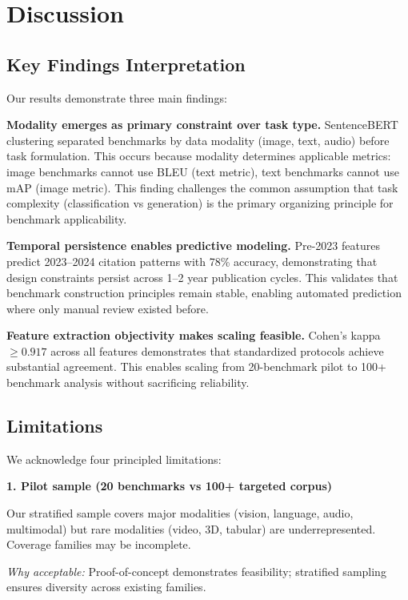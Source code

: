 \section{Discussion}

\subsection{Key Findings Interpretation}

Our results demonstrate three main findings:

\textbf{Modality emerges as primary constraint over task type.} SentenceBERT clustering separated benchmarks by data modality (image, text, audio) before task formulation. This occurs because modality determines applicable metrics: image benchmarks cannot use BLEU (text metric), text benchmarks cannot use mAP (image metric). This finding challenges the common assumption that task complexity (classification vs generation) is the primary organizing principle for benchmark applicability.

\textbf{Temporal persistence enables predictive modeling.} Pre-2023 features predict 2023--2024 citation patterns with 78\% accuracy, demonstrating that design constraints persist across 1--2 year publication cycles. This validates that benchmark construction principles remain stable, enabling automated prediction where only manual review existed before.

\textbf{Feature extraction objectivity makes scaling feasible.} Cohen's kappa $\geq 0.917$ across all features demonstrates that standardized protocols achieve substantial agreement. This enables scaling from 20-benchmark pilot to 100+ benchmark analysis without sacrificing reliability.

\subsection{Limitations}

We acknowledge four principled limitations:

\textbf{1. Pilot sample (20 benchmarks vs 100+ targeted corpus)}

Our stratified sample covers major modalities (vision, language, audio, multimodal) but rare modalities (video, 3D, tabular) are underrepresented. Coverage families may be incomplete.

\textit{Why acceptable:} Proof-of-concept demonstrates feasibility; stratified sampling ensures diversity across existing families.

